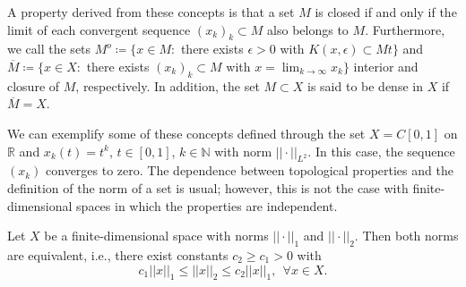 			A property derived from these concepts is that a set $M$ is closed if and only if the limit of each convergent sequence $(x_k)_k\subset M$  also belongs to $M$. Furthermore, we call the sets $M^o \coloneqq \{x\in M : $ there exists $\epsilon>0$ with $K(x,\epsilon)\subset M t\}$  and $\overline{M} \coloneqq \{x\in X:$ there exists $(x_k)_k\subset M$ with $x=\lim_{k\rightarrow\infty}x_k\}$ interior and closure of $M$, respectively. In addition, the set $M\subset X$ is said to be dense in $X$ if $\overline{M}=X$.
			
			We can exemplify some of these concepts defined through the set $X=C[0,1]$ on $\mathbb{R}$ and $x_k(t)=t^k$, $t\in[0,1]$, $k\in\mathbb{N}$ with norm $||\cdot||_{L^2}$. In this case, the sequence $(x_k)$ converges to zero. The dependence between topological properties and the definition of the norm of a set is usual; however, this is not the case with finite-dimensional spaces in which the properties are independent.
			\begin{theorem}\label{the:app:functional:2}
				Let $X$ be a finite-dimensional space with norms $||\cdot||_1$ and $||\cdot||_2$. Then both norms are equivalent, i.e., there exist constants $c_2\ge c_1>0$ with $$c_1||x||_1\le ||x||_2\le c_2||x||_1,~~ \forall x\in X.$$
			\end{theorem}
	
